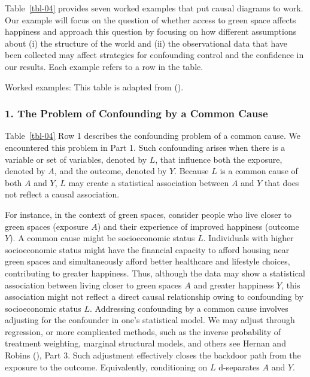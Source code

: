\documentclass[
  singlecolumn]{article}
\begin{document}
Table~\ref{tbl-04} provides seven worked examples that put causal
diagrams to work. Our example will focus on the question of whether
access to green space affects happiness and approach this question by
focusing on how different assumptions about (i) the structure of the
world and (ii) the observational data that have been collected may
affect strategies for confounding control and the confidence in our
results. Each example refers to a row in the table.

\begin{table}

\caption{\label{tbl-04}Worked examples: This table is adapted from
().}

\centering{

\terminologyelconfoundersLONG

}

\end{table}%

\subsubsection{1. The Problem of Confounding by a Common
Cause}\label{the-problem-of-confounding-by-a-common-cause}

Table~\ref{tbl-04} Row 1 describes the confounding problem of a common
cause. We encountered this problem in Part 1. Such confounding arises
when there is a variable or set of variables, denoted by \(L\), that
influence both the exposure, denoted by \(A\), and the outcome, denoted
by \(Y.\) Because \(L\) is a common cause of both \(A\) and \(Y\), \(L\)
may create a statistical association between \(A\) and \(Y\) that does
not reflect a causal association.

For instance, in the context of green spaces, consider people who live
closer to green spaces (exposure \(A\)) and their experience of improved
happiness (outcome \(Y\)). A common cause might be socioeconomic status
\(L\). Individuals with higher socioeconomic status might have the
financial capacity to afford housing near green spaces and
simultaneously afford better healthcare and lifestyle choices,
contributing to greater happiness. Thus, although the data may show a
statistical association between living closer to green spaces \(A\) and
greater happiness \(Y\), this association might not reflect a direct
causal relationship owing to confounding by socioeconomic status \(L\).
Addressing confounding by a common cause involves adjusting for the
confounder in one's statistical model. We may adjust through regression,
or more complicated methods, such as the inverse probability of
treatment weighting, marginal structural models, and others see Hernan
and Robins (), Part 3. Such
adjustment effectively closes the backdoor path from the exposure to the
outcome. Equivalently, conditioning on \(L\) d-separates \(A\) and
\(Y\).
\end{document}
